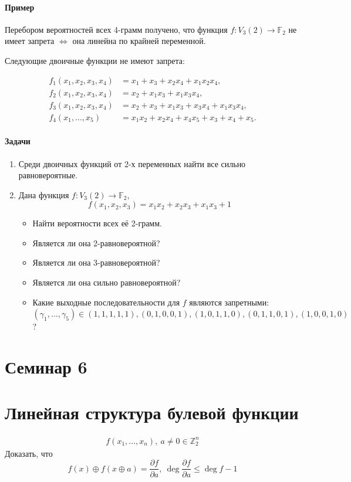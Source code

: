 \documentclass[a4paper,12pt]{article}
\newcommand{\seminary}[1]{\pagebreak\section*{#1}
	\addcontentsline{toc}{section}{#1}
}
\newcommand{\xor}{\oplus}
\newcommand{\partialfrac}[2]{\frac{\partial #1}{\partial #2}}
\newcommand{\ZZ}{\mathbb{Z}}
\begin{document}
	\paragraph{Пример}
	Перебором вероятностей всех 4-грамм получено, что функция $f: V_3(2) \rightarrow \mathbb{F}_2$ не имеет запрета $\Leftrightarrow$ она линейна по крайней переменной.

	Следующие двоичные функции не имеют запрета:

	$$
	\begin{aligned}
		f_1(x_1, x_2, x_3, x_4) &= x_1 + x_3 + x_2x_4 + x_1x_2x_4,\\
		f_2(x_1, x_2, x_3, x_4) &= x_2 + x_1x_3 + x_1x_3x_4,\\
		f_3(x_1, x_2, x_3, x_4) &= x_2 + x_3 + x_1x_3 + x_3x_4 + x_1x_3x_4, \\
		f_4(x_1, ..., x_5) &= x_1x_2 + x_2x_4 + x_4x_5 + x_3 + x_4 + x_5.
	\end{aligned}
	$$

	\paragraph{Задачи}
	\begin{enumerate}
		\item Среди двоичных функций от 2-х переменных найти все сильно равновероятные.
		\item Дана функция $f: V_3(2) \rightarrow \mathbb{F}_2$, \[ f(x_1, x_2, x_3) = x_1x_2 + x_2x_3 + x_1x_3 + 1 \]
		\begin{itemize}
			\item Найти вероятности всех её 2-грамм.
			\item Является ли она 2-равновероятной?
			\item Является ли она 3-равновероятной?
			\item Является ли она сильно равновероятной?
			\item Какие выходные последовательности для $f$ являются запретными: $(\gamma_1, ..., \gamma_5) \in {(1,1,1,1,1), (0,1,0,0,1), (1,0,1,1,0), (0,1,1,0,1), (1,0,0,1,0)}$ ?
		\end{itemize}
	\end{enumerate}

	
	\seminary{Семинар 6}
	\section{Линейная структура булевой функции}
	$$
	\begin{aligned}
		f(x_1, ..., x_n), ~ a \not = 0 \in \ZZ_2^n
	\end{aligned}
	$$
	Доказать, что
	$$
	f(x) \xor f(x \xor a) = \partialfrac{f}{a}, ~ \deg \partialfrac{f}{a} \le \deg f -1
	$$
	
\end{document}
